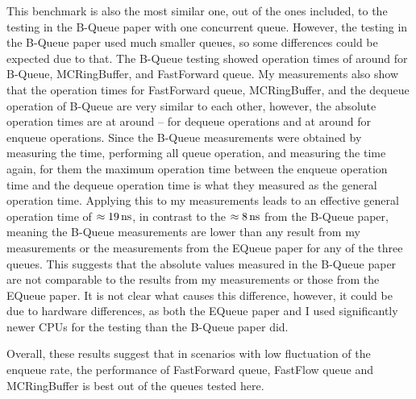 This benchmark is also the most similar one, out of the ones included, to the testing in the B-Queue paper
with one concurrent queue.
However, the testing in the B-Queue paper used much smaller queues, so some differences could be expected due to that.
The B-Queue testing showed operation times of around  for B-Queue, MCRingBuffer, and FastForward queue.
My measurements also show that the operation times for FastForward queue, MCRingBuffer, and the dequeue
operation of B-Queue are very similar to each other, however,
the absolute operation times are at around -- for dequeue operations and at around  for
enqueue operations.
Since the B-Queue measurements were obtained by measuring the time, performing all queue operation, and
measuring the time again, for them the maximum operation time between the enqueue operation time and the
dequeue operation time is what they measured as the general operation time.
Applying this to my measurements leads to an effective general operation time of $\approx\SI{19}{\nano\second}$, in
contrast to the $\approx\SI{8}{\nano\second}$ from the B-Queue paper, meaning the B-Queue measurements are lower than any
result from my measurements or the measurements from the EQueue paper for any of the three queues\cite{B-Queue,EQueue}.
This suggests that the absolute values measured in the B-Queue paper are not comparable to the results from
my measurements or those from the EQueue paper.
It is not clear what causes this difference, however, it could be due to hardware differences, as both the
EQueue paper and I used significantly newer CPUs for the testing than the B-Queue paper did.

Overall, these results suggest that in scenarios with low fluctuation of the enqueue rate, the performance of
FastForward queue, FastFlow queue and MCRingBuffer is best out of the queues tested here.
